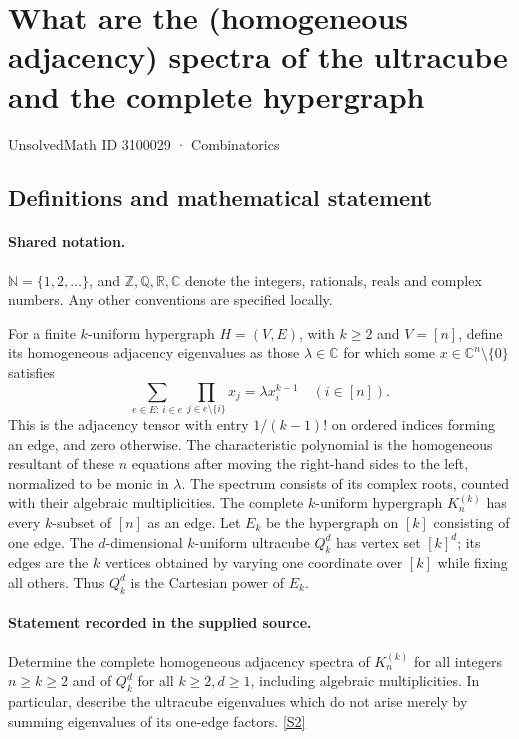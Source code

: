 \documentclass[11pt]{article}
\newcommand{\sref}[2]{\hyperlink{source:#1:#2}{[S#2]}}
\begin{document}
\setcounter{section}{3100028}
\section{What are the (homogeneous adjacency) spectra of the ultracube and the complete hypergraph}\label{3100029}
{\small\sffamily UnsolvedMath ID 3100029 · Combinatorics}
\subsection{Definitions and mathematical statement}

\paragraph{Shared notation.}$\mathbb N=\{1,2,\ldots\}$, and $\mathbb Z,\mathbb Q,\mathbb R,\mathbb C$ denote the integers, rationals, reals and complex numbers. Any other conventions are specified locally.


For a finite $k$-uniform hypergraph $H=(V,E)$, with $k\geq2$ and $V=[n]$, define its homogeneous adjacency eigenvalues as those $\lambda\in\mathbb C$ for which some $x\in\mathbb C^n\setminus\{0\}$ satisfies
\[\sum_{e\in E:\,i\in e}\prod_{j\in e\setminus\{i\}}x_j=\lambda x_i^{k-1}\quad(i\in[n]).\]
This is the adjacency tensor with entry $1/(k-1)!$ on ordered indices forming an edge, and zero otherwise. The characteristic polynomial is the homogeneous resultant of these $n$ equations after moving the right-hand sides to the left, normalized to be monic in $\lambda$. The spectrum consists of its complex roots, counted with their algebraic multiplicities. The complete $k$-uniform hypergraph $K_n^{(k)}$ has every $k$-subset of $[n]$ as an edge. Let $E_k$ be the hypergraph on $[k]$ consisting of one edge. The $d$-dimensional $k$-uniform ultracube $Q_k^d$ has vertex set $[k]^d$; its edges are the $k$ vertices obtained by varying one coordinate over $[k]$ while fixing all others. Thus $Q_k^d$ is the Cartesian power of $E_k$.
\paragraph{Statement recorded in the supplied source.}
Determine the complete homogeneous adjacency spectra of $K_n^{(k)}$ for all integers $n\geq k\geq2$ and of $Q_k^d$ for all $k\geq2,d\geq1$, including algebraic multiplicities. In particular, describe the ultracube eigenvalues which do not arise merely by summing eigenvalues of its one-edge factors. \sref{3100029}{2}
\end{document}
